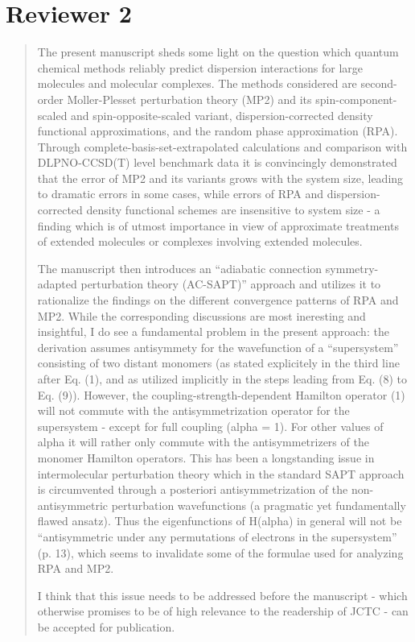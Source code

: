 \documentclass[journal=jctcce,manuscript=article]{achemso}
\newenvironment{reviewer}%
{\begin{quote}%
  \begin{changebar}\cbcolor{gray}\color{black}}%
  {\end{changebar}%
\end{quote}}
\begin{document}
\section*{Reviewer 2}
\begin{reviewer}
  The present manuscript sheds some light on the question which quantum
  chemical methods reliably predict dispersion interactions for large molecules
  and molecular complexes. The methods considered are second-order Moller-Plesset
  perturbation theory (MP2) and its spin-component-scaled and spin-opposite-scaled
  variant, dispersion-corrected density functional approximations, and the random
  phase approximation (RPA). Through complete-basis-set-extrapolated calculations
  and comparison with DLPNO-CCSD(T) level benchmark data it is convincingly
  demonstrated that the error of MP2 and its variants grows with the system size,
  leading to dramatic errors in some cases, while errors of RPA and dispersion-corrected
  density functional schemes are insensitive to system size - a finding which is
  of utmost importance in view of approximate treatments of extended molecules
  or complexes involving extended molecules.
  
  The manuscript then introduces an ``adiabatic connection symmetry-adapted
  perturbation theory (AC-SAPT)'' approach and utilizes it to rationalize the
  findings on the different convergence patterns of RPA and MP2.  While the
  corresponding discussions are most ineresting and insightful, I do see a
  fundamental problem in the present approach: the derivation assumes antisymmety
  for the wavefunction of a ``supersystem'' consisting of two distant monomers
  (as stated explicitely in the third line after Eq. (1), and as utilized implicitly
  in the steps leading from Eq. (8) to Eq. (9)). However, the coupling-strength-dependent
  Hamilton operator (1) will not commute with the antisymmetrization operator
  for the supersystem - except for  full coupling (alpha = 1). For other values
  of alpha it will rather only commute with the antisymmetrizers of the monomer
  Hamilton operators. This has been a longstanding issue in intermolecular perturbation
  theory which in the standard SAPT approach is circumvented through a posteriori
  antisymmetrization of the non-antisymmetric perturbation wavefunctions (a pragmatic
  yet fundamentally flawed ansatz). Thus the eigenfunctions of H(alpha) in general
  will not be ``antisymmetric under any permutations of electrons in the supersystem''
  (p. 13), which seems to invalidate some of the formulae used for analyzing RPA
  and MP2.
  
  I think that this issue needs to be addressed before the manuscript - which
  otherwise promises to be of high relevance to the readership of JCTC - can be
  accepted for publication.
\end{reviewer}
\end{document}
